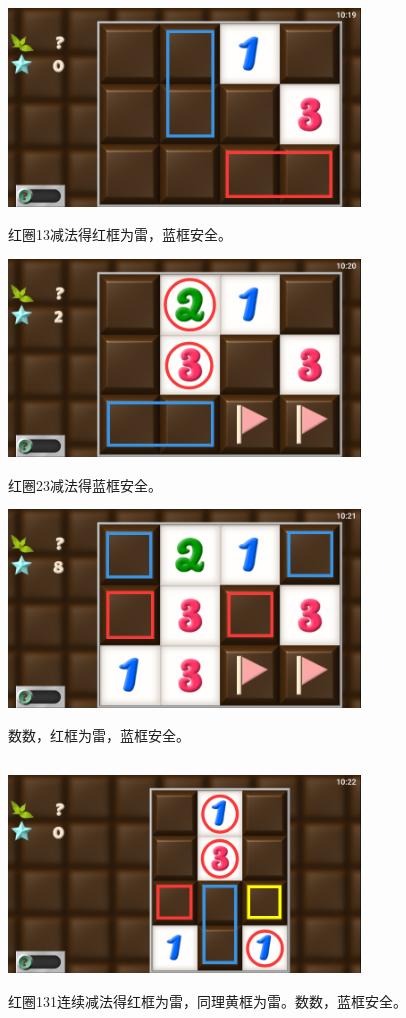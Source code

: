 \subsection{} %
\begin{center}
    \includegraphics[width=0.7\textwidth]{puzzle/19-1.png}
\end{center}
红圈13减法得红框为雷，蓝框安全。
\begin{center}
    \includegraphics[width=0.7\textwidth]{puzzle/19-2.png}
\end{center}
红圈23减法得蓝框安全。
\begin{center}
    \includegraphics[width=0.7\textwidth]{puzzle/19-3.png}
\end{center}
数数，红框为雷，蓝框安全。

\subsection{} %
\begin{center}
    \includegraphics[width=0.7\textwidth]{puzzle/20-1.png}
\end{center}
红圈131连续减法得红框为雷，同理黄框为雷。数数，蓝框安全。

